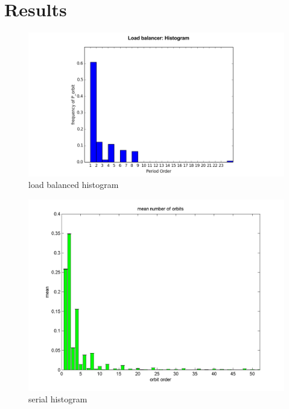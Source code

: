 \documentclass[12pt]{article}
\begin{document}
\section{Results}
\begin{figure}[H]
	\begin{center}
		\includegraphics[scale=0.4]{hist}
\caption{load balanced histogram}\label{lb_hist}
	\end{center}
\end{figure}
\begin{figure}[H]
	\begin{center}
		\includegraphics[scale=0.5]{serial_hist}
\caption{serial histogram}\label{serial_hist}
	\end{center}
\end{figure}
\end{document}
